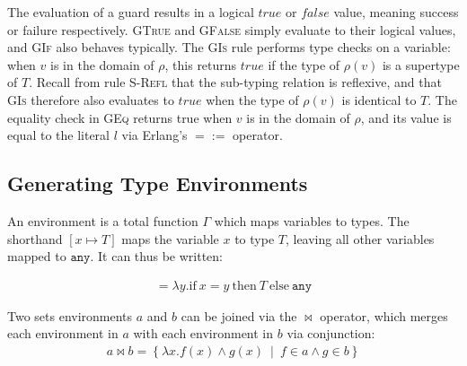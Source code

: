 \documentclass[nonacm,timestamp,manuscript]{acmart}
\newcommand{\atom}[1]{\texttt{#1}}
\begin{document}
The evaluation of a guard results in a logical $true$ or $false$ value, meaning
success or failure respectively. \textsc{GTrue} and \textsc{GFalse} simply
evaluate to their logical values, and \textsc{GIf} also behaves typically.
The \textsc{GIs} rule performs type checks on a variable: when $v$ is in the
domain of $\rho$, this returns $true$ if the type of $\rho(v)$ is a supertype of $T$.
Recall from rule \textsc{S-Refl} that the sub-typing relation is reflexive, and
that \textsc{GIs} therefore also evaluates to $true$ when the type of $\rho(v)$ is
identical to $T$. The equality check in \textsc{GEq} returns true when $v$ is
in the domain of $\rho$, and its value is equal to the literal $l$ via Erlang's
$=:=$ operator.

\subsection{Generating Type Environments}

\newcommand{\Gden}[1]{{G \llbracket{} #1 \rrbracket{}}}
\newcommand{\Proj}[2]{{\pi}_{#1} (#2)}
\newcommand{\ProjL}[1]{\Proj{1}{#1}}
\newcommand{\ProjR}[1]{\Proj{2}{#1}}
\newcommand{\JoinG}[2]{#1 \Join{} #2}
\newcommand{\Map}[2]{[#1 \mapsto{} #2]}

\begin{definition}[Environment]
  An environment is a total function $\Gamma$ which maps variables to types. The
  shorthand $\Map{x}{T}$ maps the variable $x$ to type $T$, leaving all other
  variables mapped to $\atom{any}$. It can thus be written:

  \begin{align*}
    \Map{x}{T} = \lambda y . \text{if}\ x = y\ \text{then}\ T\ \text{else}\ \atom{any}
  \end{align*}
\end{definition}

\begin{definition}
  Two sets environments $a$ and $b$ can be joined via the $\Join$ operator, which
  merges each environment in $a$ with each environment in $b$ via conjunction:
  \begin{align*}
    \JoinG{a}{b} = \left\{ \lambda x. f(x) \land g(x)\ \middle|\ f \in a \land g \in b \right\}
  \end{align*}
\end{definition}
\end{document}
